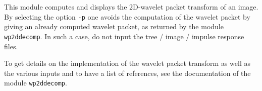 This module computes and displays the 2D-wavelet packet transform of an image.
By selecting the option \verb+-p+ one avoids the computation of the
wavelet packet by giving an already computed wavelet packet, as returned
by the module \verb+wp2ddecomp+. In such a case, do not input the
tree / image / impulse response files.


To get details on the implementation of the wavelet packet transform as well
as the various inputs and to have a list of references, see the documentation
of the module \verb+wp2ddecomp+.

